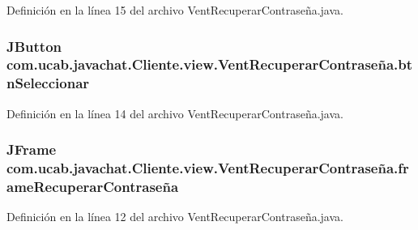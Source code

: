 Definición en la línea 15 del archivo Vent\-Recuperar\-Contraseña.\-java.

\hypertarget{classcom_1_1ucab_1_1javachat_1_1_cliente_1_1view_1_1_vent_recuperar_contrase_xC3_xB1a_a018ea4776e5b9ff7076aa560b4f19fe9}{
\subsubsection[{btn\-Seleccionar}]{\setlength{\rightskip}{0pt plus 5cm}J\-Button com.\-ucab.\-javachat.\-Cliente.\-view.\-Vent\-Recuperar\-Contraseña.\-btn\-Seleccionar}}\label{classcom_1_1ucab_1_1javachat_1_1_cliente_1_1view_1_1_vent_recuperar_contrase_xC3_xB1a_a018ea4776e5b9ff7076aa560b4f19fe9}


Definición en la línea 14 del archivo Vent\-Recuperar\-Contraseña.\-java.

\hypertarget{classcom_1_1ucab_1_1javachat_1_1_cliente_1_1view_1_1_vent_recuperar_contrase_xC3_xB1a_a04128faac0a1606d3b7377debaf91fc9}{
\subsubsection[{frame\-Recuperar\-Contraseña}]{\setlength{\rightskip}{0pt plus 5cm}J\-Frame com.\-ucab.\-javachat.\-Cliente.\-view.\-Vent\-Recuperar\-Contraseña.\-frame\-Recuperar\-Contraseña}}\label{classcom_1_1ucab_1_1javachat_1_1_cliente_1_1view_1_1_vent_recuperar_contrase_xC3_xB1a_a04128faac0a1606d3b7377debaf91fc9}


Definición en la línea 12 del archivo Vent\-Recuperar\-Contraseña.\-java.

